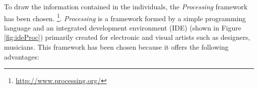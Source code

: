 To draw the information contained in the individuals, the {\em Processing} framework has been chosen.
\footnote{\url{http://www.processing.org/}}.  %
 {\em Processing} \cite{PROCESSING} is a framework formed by a simple
 programming language and an integrated development environment (IDE)
 (shown in Figure \ref{fig:ideProc}) primarily created for electronic
 and visual artists such as designers, musicians. This framework has been chosen because it offers
 the following advantages: %



